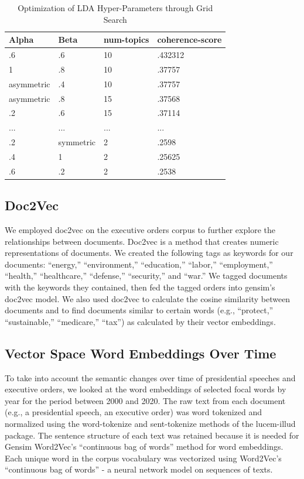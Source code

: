 \documentclass{article}
\begin{document}
{{\begin{table}[H]
	\caption{Optimization of LDA Hyper-Parameters through Grid Search}
	\centering
	\begin{tabular}{llll}
		\toprule
		\midrule
		Alpha  & Beta & num-topics & coherence-score\\
		\midrule
		\midrule
		.6 & .6 & 10 & .432312   \\
		\midrule
		1 & .8 & 10 & .37757     \\
		\midrule
		asymmetric & .4 & 10 & .37757  \\
		\midrule
		asymmetric & .8 & 15 & .37568  \\
		\midrule 
		.2 & .6 & 15 & .37114    \\
		\midrule 
		... & ... & ... & ...    \\
		\midrule 
		.2 & symmetric & 2 & .2598    \\
		\midrule 
		.4 & 1 & 2 & .25625   \\
		\midrule 
		.6 & .2 & 2 & .2538   \\
		\bottomrule
	\end{tabular}
\end{table}
}

\subsection{Doc2Vec}{We employed doc2vec on the executive orders corpus to further explore the relationships between documents. Doc2vec is a method that creates numeric representations of documents. We created the following tags as keywords for our documents: “energy,” “environment,” “education,” “labor,” “employment,” “health,” “healthcare,” “defense,” “security,” and “war.” We tagged documents with the keywords they contained, then fed the tagged orders into gensim’s doc2vec model. We also used doc2vec to calculate the cosine similarity between documents and to find documents similar to certain words (e.g., “protect,” “sustainable,” “medicare,” “tax”) as calculated by their vector embeddings.}

\subsection{Vector Space Word Embeddings Over Time}{To take into account the semantic changes over time of presidential speeches and executive orders, we looked at the word embeddings of selected focal words by year for the period between 2000 and 2020. The raw text from each document (e.g., a presidential speech, an executive order) was word tokenized and normalized using the word-tokenize and sent-tokenize methods of the lucem-illud package. The sentence structure of each text was retained because it is needed for Gensim Word2Vec’s “continuous bag of words” method for word embeddings. Each unique word in the corpus vocabulary was vectorized using Word2Vec’s “continuous bag of words” - a neural network model on sequences of texts. 
	
}}
\end{document}
